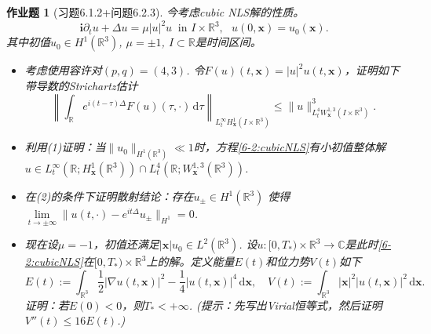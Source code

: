\documentclass[UTF8,fontset=windows,12pt]{ctexart}
\theoremstyle{kaiti-theorem}
\newtheorem{problem}{作业题}
\numberwithin{equation}{section}
\newcommand{\R}{\mathbb{R}}
\newcommand{\C}{\mathbb{C}}
\newcommand{\bd}[1]{\mathbf{#1}}  %
\newcommand{\bds}[1]{\boldsymbol{#1}}  %
\newcommand{\q}{\quad}
\newcommand{\p}{\partial}
\newcommand{\lap}{\Delta}
\newcommand{\nab}{\nabla}
\newcommand{\dxx}{\,\mathrm{d}\bds{x}}
\newcommand{\dtt}{\,\mathrm{d}\tau}
\newcommand{\xx}{{\bds{x}}}
\begin{document}
\begin{problem}[习题6.1.2+问题6.2.3]
今考虑cubic NLS解的性质。
\begin{equation}\label{6-2:cubicNLS}\tag{NLS}
\bd{i}\p_t u + \lap u = \mu |u|^2u~\text{ in }I\times\R^3,~~~u(0,\xx)=u_0(\xx).
\end{equation}其中初值$u_0\in H^1(\R^3)$, $\mu=\pm 1$, $I\subset\R$是时间区间。
\begin{itemize}
\item [(1)] 考虑使用容许对$(p,q)=(4,3)$. 令$F(u)(t,\xx)=|u|^2u(t,\xx)$，证明如下带导数的Strichartz估计
\[
\left\|\int_\R e^{i(t-\tau)\lap}F(u)(\tau,\cdot)\dtt\right\|_{L_t^\infty H_\xx^1(I\times\R^3)}\leqslant \|u\|_{L_t^4 W_\xx^{1,3}(I\times\R^3)}^3.
\]
\item [(2)] 利用(1)证明：当$\|u_0\|_{H^1(\R^3)}\ll 1$时，方程\eqref{6-2:cubicNLS}有小初值整体解  $u\in L_t^{\infty}(\R;H_\xx^1(\R^3))\cap L_t^{4}(\R;W_\xx^{1,3}(\R^3))$. 
\item [(3)] 在(2)的条件下证明散射结论：存在$u_\pm\in H^1(\R^3)$ 使得 $\lim\limits_{t\to\pm\infty}\|u(t,\cdot)-e^{it\lap}u_\pm\|_{H^1}=0$.
\item [(4)] 现在设$\mu=-1$，初值还满足$|\xx|u_0\in L^2(\R^3)$. 设$u:[0,T_*)\times\R^3\to \C$是此时\eqref{6-2:cubicNLS}在$[0,T_*)\times\R^3$上的解。定义能量$E(t)$和位力势$V(t)$如下
$$E(t):=\int_{\R^3}\frac12 |\nab u(t,\xx)|^2-\frac14 |u(t,\xx)|^4\dxx,\q V(t):=\int_{\R^3}|\xx|^2|u(t,\xx)|^2\dxx.$$ 证明：若$E(0)<0$，则$T_*<+\infty$. (提示：先写出Virial恒等式，然后证明$V''(t)\leqslant 16 E(t)$.)
\end{itemize}
\end{problem}
\end{document}
